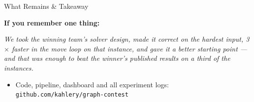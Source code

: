 \begin{frame}{What Remains \& Takeaway}

  \textbf{If you remember one thing:}
  \begin{center}
    \emph{We took the winning team's solver design, made it correct on the hardest input,
    3$\times$ faster in the move loop on that instance, and gave it a better starting
    point ---\\
    and that was enough to beat the winner's published results on a third of the instances.}
  \end{center}
  \medskip
  \begin{itemize}
    \item Code, pipeline, dashboard and all experiment logs:
          \texttt{github.com/kahlery/graph-contest}
  \end{itemize}
\end{frame}
